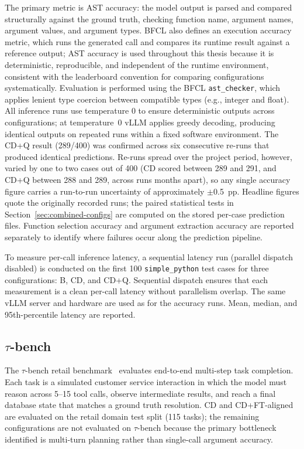 The primary metric is AST accuracy: the model output is
parsed and compared structurally against the ground truth,
checking function name, argument names, argument values, and
argument types. BFCL also defines an execution accuracy
metric, which runs the generated call and compares its
runtime result against a reference output; AST accuracy is
used throughout this thesis because it is deterministic,
reproducible, and independent of the runtime environment,
consistent with the leaderboard convention for comparing
configurations systematically. Evaluation is performed using the BFCL
\texttt{ast\_checker}, which applies lenient type coercion
between compatible types (e.g., integer and float). All
inference runs use temperature 0 to ensure deterministic
outputs across configurations; at temperature~0 vLLM applies
greedy decoding, producing identical outputs on repeated
runs within a fixed software environment. The CD+Q result
(289/400) was confirmed across six consecutive re-runs that
produced identical predictions. Re-runs spread over the
project period, however, varied by one to two cases out of
400 (CD scored between 289 and 291, and CD+Q between 288 and
289, across runs months apart), so any single accuracy
figure carries a run-to-run uncertainty of approximately
$\pm$0.5~pp. Headline figures quote the originally recorded
runs; the paired statistical tests in
Section~\ref{sec:combined-configs} are computed on the
stored per-case prediction files. Function selection accuracy
and argument extraction accuracy are reported separately to
identify where failures occur along the prediction pipeline.

To measure per-call inference latency, a sequential latency run
(parallel dispatch disabled) is conducted on the first 100
\texttt{simple\_python} test cases for three configurations: B,
CD, and CD+Q. Sequential dispatch ensures that each measurement
is a clean per-call latency without parallelism overlap. The same
vLLM server and hardware are used as for the accuracy runs.
Mean, median, and 95th-percentile latency are reported.

\subsection{$\tau$-bench}

The $\tau$-bench retail benchmark~\cite{taubench2024} evaluates
end-to-end multi-step task completion. Each task is a simulated
customer service interaction in which the model must reason across
5--15 tool calls, observe intermediate results, and reach a final
database state that matches a ground truth resolution. CD and
CD+FT-aligned are evaluated on the retail domain test split (115 tasks);
the remaining configurations are not evaluated on $\tau$-bench because
the primary bottleneck identified is multi-turn planning rather than
single-call argument accuracy.

